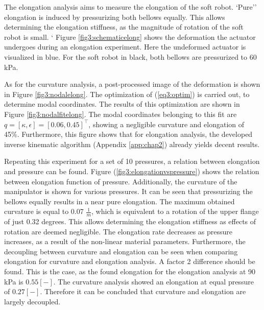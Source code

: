 The elongation analysis aims to measure the elongation of the soft robot. `Pure'' elongation is induced by pressurizing both bellows equally. This allows determining the elongation stiffness, as the magnitude of rotation of the soft robot is small. ` Figure \ref{fig3:schematicelong} shows the deformation the actuator undergoes during an elongation experiment. Here the undeformed actuator is visualized in blue. For the soft robot in black, both bellows are pressurized to 60 kPa. 

As for the curvature analysis, a post-processed image of the deformation is shown in Figure \ref{fig3:nodalelong}. The optimization of (\ref{eq3:optim}) is carried out, to determine modal coordinates. The results of this optimization are shown in Figure \ref{fig3:nodalfitelong}. The modal coordinates belonging to this fit are  $q = [\kappa,\epsilon] = [0.06, 0.45]^\top$, showing a negligible curvature and elongation of 45\%. Furthermore, this figure shows that for elongation analysis, the developed inverse kinematic algorithm (Appendix \ref{app:chap2}) already yields decent results.  

Repeating this experiment for a set of 10 pressures, a relation between elongation and pressure can be found. Figure (\ref{fig3:elongationvspressure}) shows the relation between elongation function of pressure. Additionally, the curvature of the manipulator is shown for various pressures. It can be seen that pressurizing the bellows equally results in a near pure elongation. The maximum obtained curvature is equal to 0.07 $\frac{1}{m}$, which is equivalent to a rotation of the upper flange of just 0.32 degrees. This allows determining the elongation stiffness as effects of rotation are deemed negligible. The elongation rate decreases as pressure increases, as a result of the non-linear material parameters. Furthermore, the decoupling between curvature and elongation can be seen when comparing elongation for curvature and elongation analysis. A factor 2 difference should be found. This is the case, as the found elongation for the elongation analysis at 90 kPa is $0.55 [-]$. The curvature analysis showed an elongation at equal pressure of $0.27 [-]$. Therefore it can be concluded that curvature and elongation are largely decoupled.



